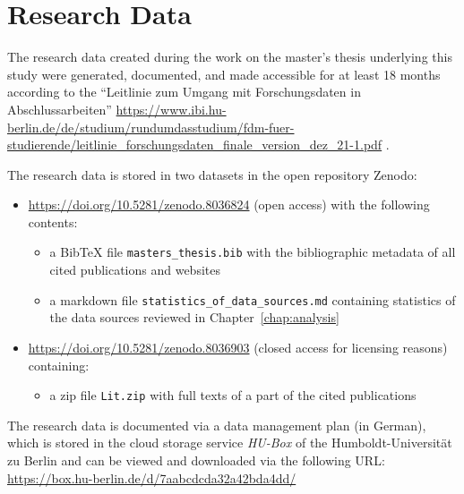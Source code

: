 \chapter{Research Data}
\label{chap:DMP}

The research data created during the work on the master's thesis underlying this study 
were generated, documented, and made accessible for at least 18 months
according to the \enquote{Leitlinie zum Umgang mit Forschungsdaten in Abschlussarbeiten}
\url{https://www.ibi.hu-berlin.de/de/studium/rundumdasstudium/fdm-fuer-studierende/leitlinie_forschungsdaten_finale_version_dez_21-1.pdf} .

The research data is stored in two datasets in the open repository Zenodo:
%
\begin{itemize}
  \item
    \url{https://doi.org/10.5281/zenodo.8036824} (open access) with the following contents:
    \begin{itemize}
      \item
        a BibTeX file \verb!masters_thesis.bib! with the bibliographic metadata of all cited publications and websites
      \item
        a markdown file \verb!statistics_of_data_sources.md! containing statistics of the data sources reviewed in Chapter~\ref{chap:analysis}
    \end{itemize}
  \item
    \url{https://doi.org/10.5281/zenodo.8036903} (closed access for licensing reasons) containing:
    \begin{itemize}
      \item
        a zip file \verb!Lit.zip! with full texts of a part of the cited publications
    \end{itemize}    
\end{itemize}

The research data is documented via a data management plan (in German),
which is stored in the cloud storage service \emph{HU-Box} of the Humboldt-Universität zu Berlin
and can be viewed and downloaded via the following URL: \url{https://box.hu-berlin.de/d/7aabcdcda32a42bda4dd/}


%
%


